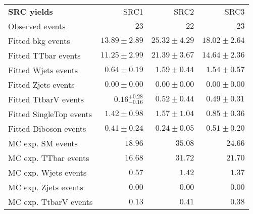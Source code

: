 

\begin{table}
\begin{center}
\setlength{\tabcolsep}{0.0pc}
{\small
\begin{tabular*}{\textwidth}{@{\extracolsep{\fill}}lrrr}
\noalign{\smallskip}\hline\noalign{\smallskip}
{\bf SRC yields}           & SRC1            & SRC2            & SRC3              \\[-0.05cm]
\noalign{\smallskip}\hline\noalign{\smallskip}
Observed events          & $23$              & $22$              & $23$                    \\
\noalign{\smallskip}\hline\noalign{\smallskip}
Fitted bkg events         & $13.89 \pm 2.89$          & $25.32 \pm 4.29$          & $18.02 \pm 2.64$              \\
\noalign{\smallskip}\hline\noalign{\smallskip}
        Fitted TTbar events         & $11.25 \pm 2.99$          & $21.39 \pm 3.67$          & $14.64 \pm 2.36$              \\
        Fitted Wjets events         & $0.64 \pm 0.19$          & $1.59 \pm 0.44$          & $1.54 \pm 0.57$              \\
        Fitted Zjets events         & $0.00 \pm 0.00$          & $0.00 \pm 0.00$          & $0.00 \pm 0.00$              \\
        Fitted TtbarV events         & $0.16_{-0.16}^{+0.28}$          & $0.52 \pm 0.44$          & $0.49 \pm 0.31$              \\
        Fitted SingleTop events         & $1.42 \pm 0.98$          & $1.57 \pm 1.04$          & $0.85 \pm 0.36$              \\
        Fitted Diboson events         & $0.41 \pm 0.24$          & $0.24 \pm 0.05$          & $0.51 \pm 0.20$              \\
 \noalign{\smallskip}\hline\noalign{\smallskip}
MC exp. SM events              & $18.96$          & $35.08$          & $24.66$              \\
\noalign{\smallskip}\hline\noalign{\smallskip}
        MC exp. TTbar events         & $16.68$          & $31.72$          & $21.70$              \\
        MC exp. Wjets events         & $0.57$          & $1.42$          & $1.37$              \\
        MC exp. Zjets events         & $0.00$          & $0.00$          & $0.00$              \\
        MC exp. TtbarV events         & $0.13$          & $0.41$          & $0.38$              \\

\end{tabular*}}
\end{center}
\end{table}

